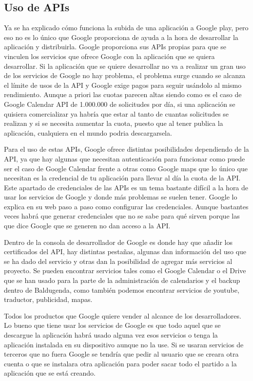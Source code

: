 \subsection{Uso de APIs}
\label{subsecc:Uso de APIs}

Ya se ha explicado cómo funciona la subida de una aplicación a Google play, pero eso no es lo único que Google proporciona de ayuda a la hora de desarrollar la aplicación y distribuirla.
Google proporciona sus APIs propias para que se vinculen los servicios que ofrece Google con la aplicación que se quiera desarrollar. Si la aplicación que se quiere desarrollar no va a realizar un gran uso de los servicios de Google no hay problema, el problema surge cuando se alcanza el límite de usos de la API y Google exige pagos para seguir usándolo al mismo rendimiento.
Aunque a priori las cuotas parecen altas siendo como es el caso de Google Calendar API de 1.000.000 de solicitudes por día, si una aplicación se quisiera comercializar ya habría que estar al tanto de cuantas solicitudes se realizan y si se necesita aumentar la cuota, puesto que al tener publica la aplicación, cualquiera en el mundo podria descargarsela.

Para el uso de estas APIs, Google ofrece distintas posibilidades dependiendo de la API, ya que hay algunas que necesitan autenticación para funcionar como puede ser el caso de Google Calendar frente a otras como Google maps que lo único que necesitan es la credencial de tu aplicación para llevar al día la cuota de la API.
Este apartado de credenciales de las APIs es un tema bastante difícil a la hora de usar los servicios de Google y donde más problemas se suelen tener. Google lo explica en su web paso a paso como configurar las credenciales. Aunque bastantes veces habrá que generar credenciales que no se sabe para qué sirven porque las que dice Google que se generen no dan acceso a la API.

Dentro de la consola de desarrollador de Google es donde hay que añadir los certificados del API, hay distintas pestañas, algunas dan información del uso que se ha dado del servicio y otras dan la posibilidad de agregar más servicios al proyecto.
Se pueden encontrar servicios tales como el Google Calendar o el Drive que se han usado para la parte de la administración de calendarios y el backup dentro de Baldugenda, como también podemos encontrar servicios de youtube, traductor, publicidad, mapas. 

Todos los productos que Google quiere vender al alcance de los desarrolladores.
Lo bueno que tiene usar los servicios de Google es que todo aquel que se descargue la aplicación habrá usado alguna vez esos servicios o tenga la aplicación instalada en su dispositivo aunque no la use. Si se usaran servicios de terceros que no fuera Google se tendría que pedir al usuario que se creara otra cuenta o que se instalara otra aplicación para poder sacar todo el partido a la aplicación que se está creando.

